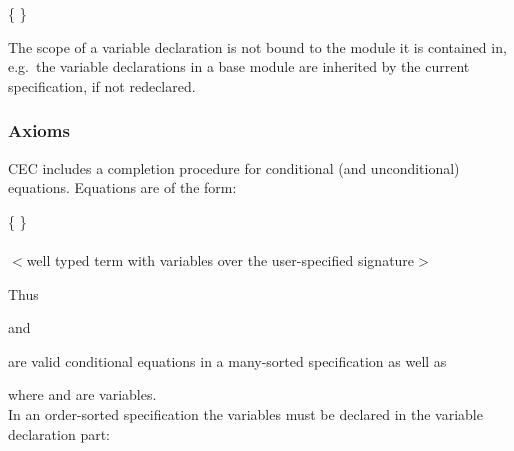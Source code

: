 {\begin{syntax}
 \IS {} 
  \{ \kw{,}  \}  \END
{} \IS {} \kw{:} 
\end{syntax}

The scope of a variable declaration is not bound to the module it is
contained in, e.g.\ the variable declarations in a base module are
inherited by the current specification, if not redeclared.

\subsubsection{Axioms}
\label{axioms}

CEC includes a completion procedure for conditional (and unconditional)
equations. Equations are of the form:

\begin{syntax}
 \IS {} 
           \OR  {}  \END
{} \IS {} \END
{}   \IS {}  \END
{} \IS {} \{   \} \kw{=>}\END
\\
 \IS {} \kw{=}  \END
\\
 \IS $<$well typed term with variables
		   \GETON \hspace{1ex} over the user-specified signature$>$
\end{syntax}

\noindent Thus \bigskip

 \bigskip

\noindent and\bigskip

\bigskip

\noindent
are valid conditional equations in a many-sorted specification as well as\bigskip

\bigskip

\noindent
where  and  are variables.\\
In an order-sorted specification the variables must be declared 
in the variable declaration part:\bigskip

 \bigskip

}
